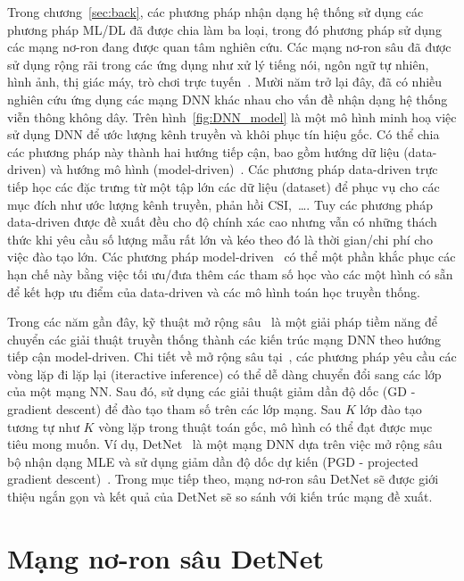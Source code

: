 Trong chương~\ref{sec:back}, các phương pháp nhận dạng hệ thống sử dụng các phương pháp ML/DL đã được chia làm ba loại, trong đó phương pháp sử dụng các mạng nơ-ron đang được quan tâm nghiên cứu. Các mạng nơ-ron sâu đã được sử dụng rộng rãi trong các ứng dụng như xử lý tiếng nói, ngôn ngữ tự nhiên, hình ảnh, thị giác máy, trò chơi trực tuyến~\cite{Samek2021}. Mười năm trở lại đây, đã có nhiều nghiên cứu ứng dụng các mạng DNN khác nhau cho vấn đề nhận dạng hệ thống viễn thông không dây. Trên hình~\ref{fig:DNN_model} là một mô hình minh hoạ việc sử dụng DNN để ước lượng kênh truyền và khôi phục tín hiệu gốc. Có thể chia các phương pháp này thành hai hướng tiếp cận, bao gồm hướng dữ liệu (data-driven) và hướng mô hình (model-driven)~\cite{Liao2020}. Các phương pháp data-driven trực tiếp học các đặc trưng từ một tập lớn các dữ liệu (dataset) để phục vụ cho các mục đích như ước lượng kênh truyền, phản hồi CSI,~\ldots. Tuy các phương pháp data-driven được đề xuất đều cho độ chính xác cao nhưng vẫn có những thách thức khi yêu cầu số lượng mẫu rất lớn và kéo theo đó là thời gian/chi phí cho việc đào tạo lớn. Các phương pháp model-driven~\cite{He2019} có thể một phần khắc phục các hạn chế này bằng việc tối ưu/đưa thêm các tham số học vào các một hình có sẵn để kết hợp ưu điểm của data-driven và các mô hình toán học truyền thống. 

Trong các năm gần đây, kỹ thuật mở rộng sâu~\cite{Wisdom2016} là một giải pháp tiềm năng để chuyển các giải thuật truyền thống thành các kiến trúc mạng DNN theo hướng tiếp cận model-driven. Chi tiết về mở rộng sâu tại~\cite{John2014}, các phương pháp yêu cầu các vòng lặp đi lặp lại (iteractive inference) có thể dễ dàng chuyển đổi sang các lớp của một mạng NN. Sau đó, sử dụng các giải thuật giảm dần độ dốc (GD - gradient descent) để đào tạo tham số trên các lớp mạng. Sau $K$ lớp đào tạo tương tự như $K$ vòng lặp trong thuật toán gốc, mô hình có thể đạt được mục tiêu mong muốn. Ví dụ, DetNet~\cite{Samuel2017} là một mạng DNN dựa trên việc mở rộng sâu bộ nhận dạng MLE và sử dụng giảm dần độ dốc dự kiến (PGD - projected gradient descent)~\cite{Chen2015}. Trong mục tiếp theo, mạng nơ-ron sâu DetNet sẽ được giới thiệu ngắn gọn và kết quả của DetNet sẽ so sánh với kiến trúc mạng đề xuất.

\section{Mạng nơ-ron sâu DetNet}

